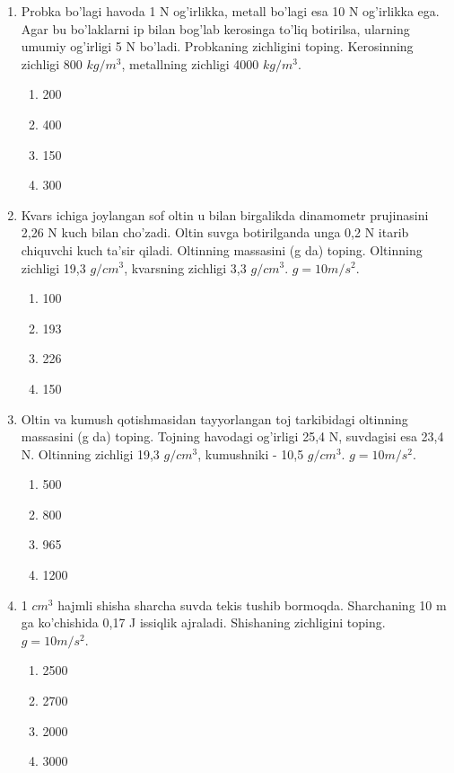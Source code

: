 \begin{enumerate}
\item Probka bo'lagi havoda 1 N og'irlikka, metall bo'lagi esa 10 N og'irlikka ega. Agar bu bo'laklarni ip bilan bog'lab kerosinga to'liq botirilsa, ularning umumiy og'irligi 5 N bo'ladi. Probkaning zichligini toping. Kerosinning zichligi 800 $kg/m^3$, metallning zichligi 4000 $kg/m^3$.
\begin{enumerate}[label=\Alph*)]
\item 200
\item 400
\item 150
\item 300
\end{enumerate}

\item Kvars ichiga joylangan sof oltin u bilan birgalikda dinamometr prujinasini 2,26 N kuch bilan cho'zadi. Oltin suvga botirilganda unga 0,2 N itarib chiquvchi kuch ta'sir qiladi. Oltinning massasini (g da) toping. Oltinning zichligi 19,3 $g/cm^3$, kvarsning zichligi 3,3 $g/cm^3$. $g=10m/s^2$.
\begin{enumerate}[label=\Alph*)]
\item 100
\item 193
\item 226
\item 150
\end{enumerate}

\item Oltin va kumush qotishmasidan tayyorlangan toj tarkibidagi oltinning massasini (g da) toping. Tojning havodagi og'irligi 25,4 N, suvdagisi esa 23,4 N. Oltinning zichligi 19,3 $g/cm^3$, kumushniki - 10,5 $g/cm^3$. $g=10m/s^2$.
\begin{enumerate}[label=\Alph*)]
\item 500
\item 800
\item 965
\item 1200
\end{enumerate}

\item 1 $cm^3$ hajmli shisha sharcha suvda tekis tushib bormoqda. Sharchaning 10 m ga ko'chishida 0,17 J issiqlik ajraladi. Shishaning zichligini toping. $g=10m/s^2$.
\begin{enumerate}[label=\Alph*)]
\item 2500
\item 2700
\item 2000
\item 3000
\end{enumerate}


\end{enumerate}
